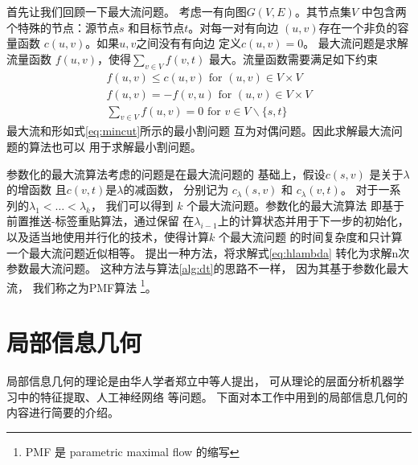 首先让我们回顾一下最大流问题。
考虑一有向图$G(V,E)$。其节点集$V$
中包含两个特殊的节点：源节点$s$
和目标节点$t$。对每一对有向边
$(u,v)$存在一个非负的容量函数
$c(u,v)$。如果$u,v$之间没有有向边
定义$c(u,v)=0$。
最大流问题是求解流量函数
$f(u,v)$，使得$\sum_{v\in V} f(v,t)$
最大。流量函数需要满足如下约束
\begin{align}
  f(u, v) \leq c(u, v) \textrm{ for } (u, v) \in V \times V \\
  f(u, v) = -f(v, u) \textrm{ for } (u, v) \in V \times V \\
  \sum_{v \in V} f(u,v) = 0 \textrm{ for } v\in V\backslash\{s, t\}
\end{align}
最大流和形如式\eqref{eq:mincut}所示的最小割问题
互为对偶问题。因此求解最大流问题的算法也可以
用于求解最小割问题。

参数化的最大流算法考虑的问题是在最大流问题的
基础上，假设$c(s,v)$ 
是关于$\lambda$的增函数
且$c(v, t)$是$\lambda$的减函数，
分别记为
$c_{\lambda}(s,v)$ 和 $c_{\lambda}(v, t)$。
对于一系列的$\lambda_1 < \dots < \lambda_k$，
我们可以得到 $k$ 个最大流问题。参数化的最大流算法
即基于前置推送-标签重贴算法，通过保留
在$\lambda_{i-1}$上的计算状态并用于下一步的初始化，
以及适当地使用并行化的技术，使得计算$k$ 个最大流问题
的时间复杂度和只计算一个最大流问题近似相等。
\citet{kolmogorov} 提出一种方法，将求解式\ref{eq:hlambda}
转化为求解n次参数最大流问题。
这种方法与算法\ref{alg:dt}的思路不一样，
因为其基于参数化最大流，
我们称之为PMF算法
\footnote{PMF 是 parametric maximal flow 的缩写}。

\section{局部信息几何}\label{sec:local_geometry}
局部信息几何的理论是由华人学者郑立中等人提出\cite{huang2019universal}，
可从理论的层面分析机器学习中的特征提取\cite{huang2017information}、人工神经网络
\cite{huang2019information}等问题。
下面对本工作中用到的局部信息几何的内容进行简要的介绍。

